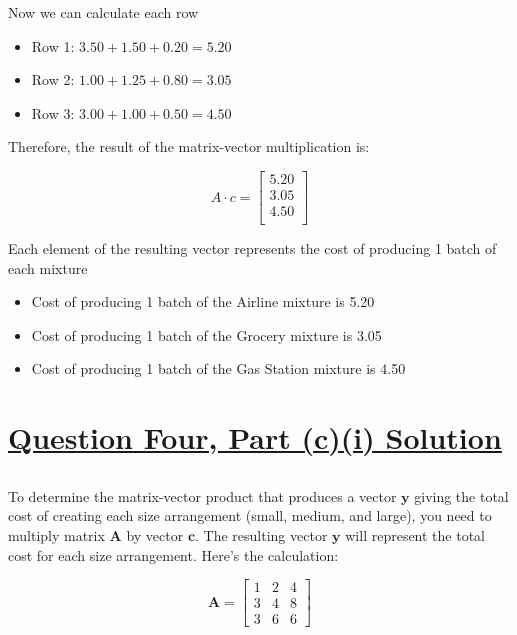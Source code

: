 \documentclass{article}
\begin{document}
Now we can calculate each row

\begin{itemize}
    \item Row 1: $3.50 + 1.50 + 0.20 = 5.20$
    \item Row 2: $1.00 + 1.25 + 0.80 = 3.05$
    \item Row 3: $3.00 + 1.00 + 0.50 = 4.50$
\end{itemize}

Therefore, the result of the matrix-vector multiplication is:

\[
A \cdot c =
\begin{bmatrix}
5.20 \\
3.05 \\
4.50 \\
\end{bmatrix}
\]

Each element of the resulting vector represents the cost of producing 1 batch of each mixture

\begin{itemize}
    \item Cost of producing 1 batch of the Airline mixture is \textdollar{}5.20
    \item Cost of producing 1 batch of the Grocery mixture is \textdollar{}3.05
    \item Cost of producing 1 batch of the Gas Station mixture is \textdollar{}4.50
\end{itemize}

\section*{\uline{\large Question Four, Part (c)(i) Solution}}

\subsection*{}

To determine the matrix-vector product that produces a vector $\mathbf{y}$ giving the total cost of creating each size arrangement (small, medium, and large), you need to multiply matrix $\mathbf{A}$ by vector $\mathbf{c}$. The resulting vector $\mathbf{y}$ will represent the total cost for each size arrangement. Here's the calculation:

\[
\mathbf{A} = \begin{bmatrix}
1 & 2 & 4 \\
3 & 4 & 8 \\
3 & 6 & 6
\end{bmatrix}
\]
\end{document}

